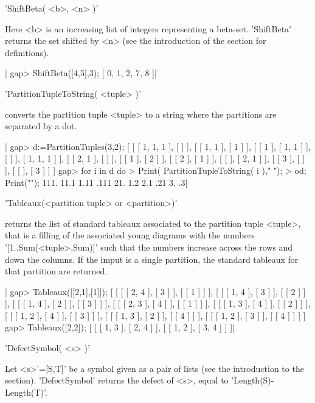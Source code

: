 'ShiftBeta( <b>, <n> )'

Here  <b>  is  an  increasing  list  of  integers  representing a beta-set.
'ShiftBeta'  returns the  set shifted  by <n>  (see the introduction of the
section for definitions).

|    gap> ShiftBeta([4,5],3);
      [ 0, 1, 2, 7, 8 ]|

%
%

'PartitionTupleToString( <tuple> )'

converts the partition tuple <tuple>  to a string where the partitions
are separated by a dot.

|    gap> d:=PartitionTuples(3,2);
    [ [ [ 1, 1, 1 ], [  ] ], [ [ 1, 1 ], [ 1 ] ], [ [ 1 ], [ 1, 1 ] ],
      [ [  ], [ 1, 1, 1 ] ], [ [ 2, 1 ], [  ] ], [ [ 1 ], [ 2 ] ],
      [ [ 2 ], [ 1 ] ], [ [  ], [ 2, 1 ] ], [ [ 3 ], [  ] ],
      [ [  ], [ 3 ] ] ]
    gap>  for i in d do
    >      Print( PartitionTupleToString( i ),"   ");
    >  od; Print("\n");
    111.   11.1   1.11   .111   21.   1.2   2.1   .21   3.   .3|

%
%

'Tableaux(<partition tuple> or <partition>)'

returns  the list  of standard  tableaux associated  to the partition tuple
<tuple>,  that  is  a  filling  of  the  associated young diagrams with the
numbers  '[1..Sum(<tuple>,Sum)]' such that the  numbers increase across the
rows and down the columns. If the imput is a single partition, the standard
tableaux for that partition are returned.

|    gap> Tableaux([[2,1],[1]]);
    [ [ [ [ 2, 4 ], [ 3 ] ], [ [ 1 ] ] ], 
      [ [ [ 1, 4 ], [ 3 ] ], [ [ 2 ] ] ],
      [ [ [ 1, 4 ], [ 2 ] ], [ [ 3 ] ] ], 
      [ [ [ 2, 3 ], [ 4 ] ], [ [ 1 ] ] ],
      [ [ [ 1, 3 ], [ 4 ] ], [ [ 2 ] ] ], 
      [ [ [ 1, 2 ], [ 4 ] ], [ [ 3 ] ] ],
      [ [ [ 1, 3 ], [ 2 ] ], [ [ 4 ] ] ], 
      [ [ [ 1, 2 ], [ 3 ] ], [ [ 4 ] ] ] ]
    gap> Tableaux([2,2]);
      [ [ [ 1, 3 ], [ 2, 4 ] ], [ [ 1, 2 ], [ 3, 4 ] ] ]|


'DefectSymbol( <s> )'

Let  <s>'=[S,T]'  be  a  symbol  given  as a  pair  of  lists  (see  the
introduction to the  section). 'DefectSymbol' returns the  defect of <s>,
equal to 'Length(S)-Length(T)'.


